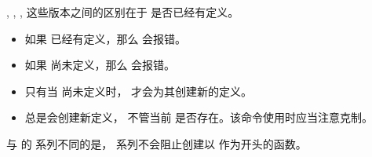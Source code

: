 \documentclass{l3doc}
\begin{document}
, , ,  
这些版本之间的区别在于  是否已经有定义。
\begin{itemize}
    \item 如果  已经有定义，那么  会报错。
    \item 如果  尚未定义，那么  会报错。
    \item 只有当  尚未定义时， 才会为其创建新的定义。
    \item {} 总是会创建新定义，
    不管当前  是否存在。该命令使用时应当注意克制。
%
\end{itemize}

%
\begin{texnote}
    与 \LaTeXe{} 的  系列不同的是，
     系列不会阻止创建以  作为开头的函数。
\end{texnote}
\end{document}

